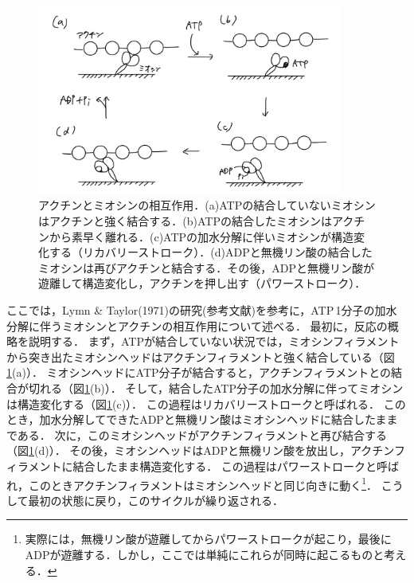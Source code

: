 \documentclass[a4paper,11pt, titlepage]{jsarticle}
\begin{document}
\begin{figure}[htbp]
    \centering
    \includegraphics[width=10cm]{actin_myosin.jpg}
    \caption{アクチンとミオシンの相互作用．(a)ATPの結合していないミオシンはアクチンと強く結合する．(b)ATPの結合したミオシンはアクチンから素早く離れる．(c)ATPの加水分解に伴いミオシンが構造変化する（リカバリーストローク）．(d)ADPと無機リン酸の結合したミオシンは再びアクチンと結合する．その後，ADPと無機リン酸が遊離して構造変化し，アクチンを押し出す（パワーストローク）．}
    \label{fig:actin_myosin}
\end{figure}

ここでは，Lymn \& Taylor(1971)の研究(参考文献\cite{actin_myosin})を参考に，ATP\,1分子の加水分解に伴うミオシンとアクチンの相互作用について述べる．
最初に，反応の概略を説明する．
まず，ATPが結合していない状況では，ミオシンフィラメントから突き出たミオシンヘッドはアクチンフィラメントと強く結合している（図\ref{fig:actin_myosin}(a)）．
ミオシンヘッドにATP分子が結合すると，アクチンフィラメントとの結合が切れる（図\ref{fig:actin_myosin}(b)）．
そして，結合したATP分子の加水分解に伴ってミオシンは構造変化する（図\ref{fig:actin_myosin}(c)）．
この過程はリカバリーストロークと呼ばれる．
このとき，加水分解してできたADPと無機リン酸はミオシンヘッドに結合したままである．
次に，このミオシンヘッドがアクチンフィラメントと再び結合する（図\ref{fig:actin_myosin}(d)）．
その後，ミオシンヘッドはADPと無機リン酸を放出し，アクチンフィラメントに結合したまま構造変化する．
この過程はパワーストロークと呼ばれ，このときアクチンフィラメントはミオシンヘッドと同じ向きに動く\footnote{実際には，無機リン酸が遊離してからパワーストロークが起こり，最後にADPが遊離する\cite{life_science}．しかし，ここでは単純にこれらが同時に起こるものと考える．}．
こうして最初の状態に戻り，このサイクルが繰り返される．
\end{document}
